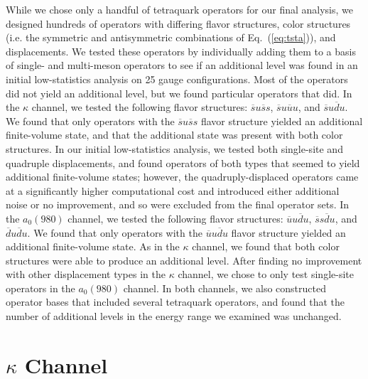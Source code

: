 While we chose only a handful of tetraquark operators for our final analysis, we designed hundreds of operators with differing flavor structures, color structures (i.e. the symmetric and antisymmetric combinations of Eq.~(\ref{eq:tsta})), and displacements. We tested these operators by individually adding them to a basis of single- and multi-meson operators to see if an additional level was found in an initial low-statistics analysis on 25 gauge configurations. Most of the operators did not yield an additional level, but we found particular operators that did. In the $\kappa$ channel, we tested the following flavor structures: $\overline s u \overline s s$, $\overline s u \overline u u$, and $\overline s u \overline d u$. We found that only operators with the $\overline s u \overline s s$ flavor structure yielded an additional finite-volume state, and that the additional state was present with both color structures. In our initial low-statistics analysis, we tested both single-site and quadruple displacements, and found operators of both types that seemed to yield additional finite-volume states; however, the quadruply-displaced operators came at a significantly higher computational cost and introduced either additional noise or no improvement, and so were excluded from the final operator sets. In the $a_0(980)$ channel, we tested the following flavor structures: $\overline u u \overline d u$, $\overline s s \overline d u$, and $\overline d u \overline d u$. We found that only operators with the $\overline u u \overline d u$ flavor structure yielded an additional finite-volume state. As in the $\kappa$ channel, we found that both color structures were able to produce an additional level. After finding no improvement with other displacement types in the $\kappa$ channel, we chose to only test single-site operators in the $a_0(980)$ channel. In both channels, we also constructed operator bases that included several tetraquark operators, and found that the number of additional levels in the energy range we examined was unchanged.

\section{$\kappa$ Channel}
